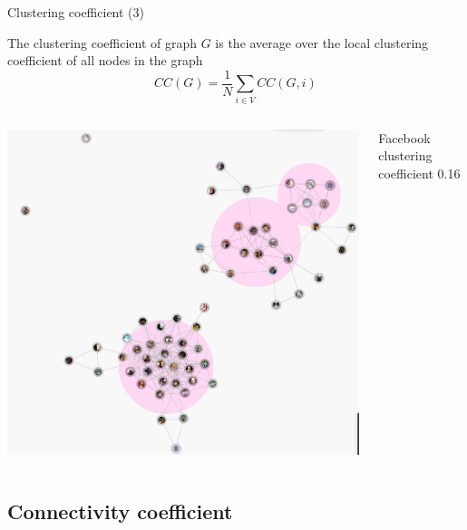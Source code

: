 \begin{frame}{Clustering coefficient (3)}

\begin{definition}

The \alert{clustering coefficient} of graph $G$ is the average over the local 
  clustering coefficient of all nodes in the graph
  \[
     CC(G) = \frac{1}{N} \sum_{i \in V} CC(G,i)
  \]
\end{definition}

\begin{columns}
	\begin{column}{0.35\textwidth}
		\includegraphics[width=\textwidth]{figs/08/facebook}
	\end{column}
	\begin{column}{0.65\textwidth}
		\BI
		\item Facebook clustering coefficient 0.16
		\EI
	\end{column}
\end{columns}
\end{frame}

\subsection{Connectivity coefficient}

